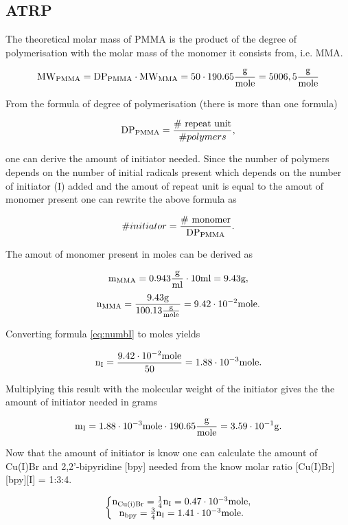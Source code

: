 \subsection{ATRP}

    The theoretical molar mass of PMMA is the product of the degree of polymerisation
    with the molar mass of the monomer it consists from, i.e. MMA.
    
    $$\mathtext[PMMA]{MW} = \mathtext[PMMA]{DP} \cdot \mathtext[MMA]{MW} = 50 \cdot 190.65\MW =5006,5\MW$$

    From the formula of degree of polymerisation (there is more than one formula)

    \begin{equation}
        \mathtext[PMMA]{DP} = \frac{\text{\# repeat unit}}{\# polymers},
        \label{eq:DPpmma}
    \end{equation}

    one can derive the amount of initiator needed. Since the number of polymers depends
    on the number of initial radicals present which depends on the number of initiator (I) added
    and the amout of repeat unit is equal to the amout of monomer present one can rewrite the above formula as 

    \begin{equation}
        \# initiator = \frac{\text{\# monomer}}{\mathtext[PMMA]{DP}}.
        \label{eq:numbI}
    \end{equation}

    The amout of monomer present in moles can be derived as

    $$\mathtext[MMA]{m} = 0.943\density\cdot 10\ml = 9.43\g,$$
    $$\mathtext[MMA]{n} = \frac{9.43\g}{100.13\MW} = 9.42\cdot10^{-2}\mole.$$

    Converting formula \ref{eq:numbI} to moles yields

    $$\mathtext[I]{n} = \frac{9.42\cdot10^{-2}\mole}{50}=1.88\cdot10^{-3}\mole.$$

    Multiplying this result with the molecular weight of the initiator gives the
    the amount of initiator needed in grams

    $$\mathtext[I]{m} = 1.88\cdot10^{-3}\mole \cdot 190.65\MW = 3.59\cdot10^{-1}\g.$$

    Now that the amount of initiator is know one can calculate the amount of Cu(I)Br and 
    2,2'-bipyridine [bpy] needed from the know molar ratio [Cu(I)Br][bpy][I] = 1:3:4.

    $$\left\{\begin{matrix}
        \mathtext[Cu(i)Br]{n} = \frac{1}{4}\mathtext[I]{n} = 0.47\cdot10^{-3}\mole,\\
        \mathtext[bpy]{n} = \frac{3}{4}\mathtext[I]{n} = 1.41\cdot10^{-3}\mole.\\
    \end{matrix}\right.$$

